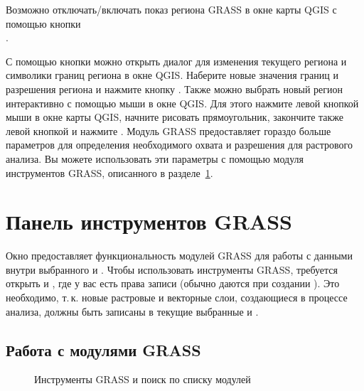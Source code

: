 Возможно отключать/включать показ региона GRASS в окне карты QGIS с
помощью кнопки \\
.

С помощью кнопки 
можно открыть диалог для изменения текущего региона и символики границ
региона в окне QGIS. Наберите новые значения границ и разрешения региона
и нажмите кнопку . Также можно выбрать новый регион
интерактивно с помощью мыши в окне QGIS. Для этого нажмите левой кнопкой
мыши в окне карты QGIS, начните рисовать прямоугольник, закончите также
левой кнопкой и нажмите .
Модуль GRASS  предоставляет гораздо больше
параметров для определения необходимого охвата и разрешения для
растрового анализа. Вы можете использовать эти параметры с помощью
модуля инструментов GRASS, описанного в разделе~\ref{subsec:grass_toolbox}.

\section{Панель инструментов GRASS}\label{subsec:grass_toolbox}

Окно  предоставляет
функциональность модулей GRASS для работы с данными внутри выбранного
 и . Чтобы использовать инструменты
GRASS, требуется открыть  и , где у
вас есть права записи (обычно даются при создании ).
Это необходимо, т.\,к. новые растровые и векторные слои, создающиеся в
процессе анализа, должны быть записаны в текущие выбранные
 и .

\subsection{Работа с модулями GRASS}\label{grass_modules}

\begin{figure}[ht]
\centering
   \hspace{0.5cm}
\caption{Инструменты GRASS и поиск по списку модулей \nixcaption}\label{fig:grass_modules}
\end{figure}

